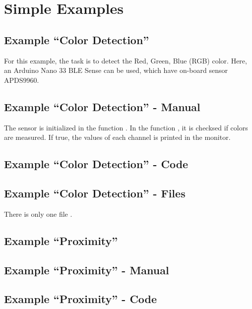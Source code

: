 \section{Simple Examples}

\subsection{Example ``Color Detection''}

For this example, the task is to detect the Red, Green, Blue (RGB) color. Here, an Arduino Nano 33 BLE Sense can be used, which have on-board sensor APDS9960. 



 
\subsection{Example ``Color Detection'' - Manual}

The sensor is initialized in the function . In the function , it is checksed if colors are measured. If true, the values of each channel is printed in the monitor.


\subsection{Example ``Color Detection'' - Code}


{
    \label{TestAPDS9960Color}
}



\subsection{Example ``Color Detection'' - Files}

There is only one file .

\subsection{Example ``Proximity''}

\subsection{Example ``Proximity'' - Manual}


\subsection{Example ``Proximity'' - Code}



